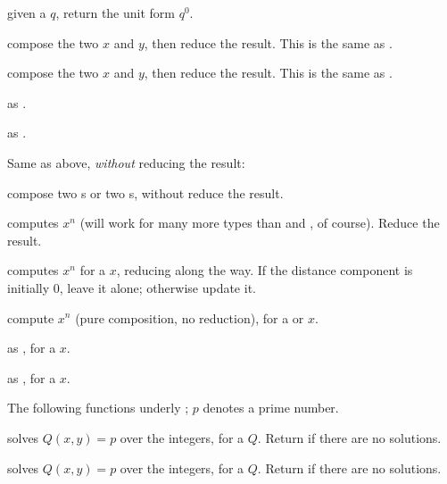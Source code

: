  given a  $q$, return the unit form $q^0$.


 compose the two  $x$ and $y$,
then reduce the result. This is the same as .

 compose the two  $x$ and $y$,
then reduce the result. This is the same as .

 as .

 as .

\noindent Same as above, \emph{without} reducing the result:





 compose two s or two s,
without reduce the result.


 computes $x^n$ (will work for many more types
than  and , of course). Reduce the result.

 computes $x^n$ for a  $x$, reducing
along the way. If the distance component is initially $0$, leave it alone;
otherwise update it.

 compute $x^n$ (pure composition, no
reduction), for a  or  $x$.

 as , for a  $x$.

 as , for a  $x$.


The following functions underly ; $p$ denotes a prime number.

 solves $Q(x,y) = p$ over the integers, for
a  $Q$. Return  if there are no solutions.

 solves $Q(x,y) = p$ over the integers, for
a  $Q$. Return  if there are no solutions.

